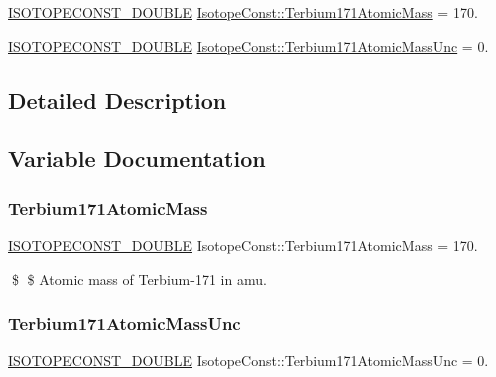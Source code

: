 \begin{DoxyCompactItemize}
\item 
\mbox{\hyperlink{group___isotope_const-_macros_ga8f45a7272ce02c0b4c65c44636ed719a}{I\+S\+O\+T\+O\+P\+E\+C\+O\+N\+S\+T\+\_\+\+D\+O\+U\+B\+LE}} \mbox{\hyperlink{group___isotope_const-_terbium-_tb171_gae5c19dfdf1742579d60bda7562c80ddd}{Isotope\+Const\+::\+Terbium171\+Atomic\+Mass}} = 170.
\item 
\mbox{\hyperlink{group___isotope_const-_macros_ga8f45a7272ce02c0b4c65c44636ed719a}{I\+S\+O\+T\+O\+P\+E\+C\+O\+N\+S\+T\+\_\+\+D\+O\+U\+B\+LE}} \mbox{\hyperlink{group___isotope_const-_terbium-_tb171_ga831dd0432d9c665913a0b3482faba5bf}{Isotope\+Const\+::\+Terbium171\+Atomic\+Mass\+Unc}} = 0.
\end{DoxyCompactItemize}


\subsection{Detailed Description}


\subsection{Variable Documentation}
\mbox{\label{group___isotope_const-_terbium-_tb171_gae5c19dfdf1742579d60bda7562c80ddd}} 
\subsubsection{\texorpdfstring{Terbium171\+Atomic\+Mass}{Terbium171AtomicMass}}
{\footnotesize\ttfamily \mbox{\hyperlink{group___isotope_const-_macros_ga8f45a7272ce02c0b4c65c44636ed719a}{I\+S\+O\+T\+O\+P\+E\+C\+O\+N\+S\+T\+\_\+\+D\+O\+U\+B\+LE}} Isotope\+Const\+::\+Terbium171\+Atomic\+Mass = 170.}

\$ \$ Atomic mass of Terbium-\/171 in amu. \mbox{\label{group___isotope_const-_terbium-_tb171_ga831dd0432d9c665913a0b3482faba5bf}} 
\subsubsection{\texorpdfstring{Terbium171\+Atomic\+Mass\+Unc}{Terbium171AtomicMassUnc}}
{\footnotesize\ttfamily \mbox{\hyperlink{group___isotope_const-_macros_ga8f45a7272ce02c0b4c65c44636ed719a}{I\+S\+O\+T\+O\+P\+E\+C\+O\+N\+S\+T\+\_\+\+D\+O\+U\+B\+LE}} Isotope\+Const\+::\+Terbium171\+Atomic\+Mass\+Unc = 0.}

